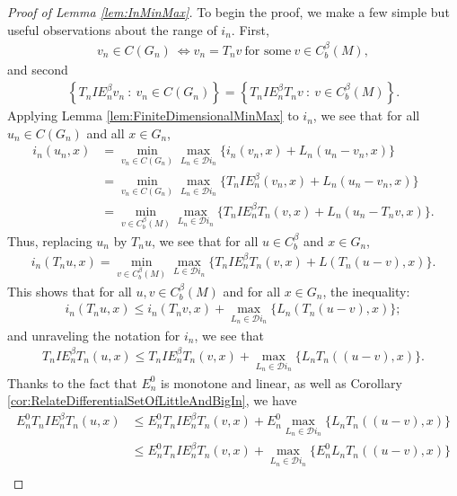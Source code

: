 \documentclass[11pt,reqno]{amsart}
\numberwithin{equation}{section}
\theoremstyle{plain}
\def\D{\mathcal D}
\begin{document}
\begin{proof}[Proof of Lemma \ref{lem:InMinMax}]
	To begin the proof, we make a few simple but useful observations about the range of $i_n$.  First,
	\begin{align*}
		v_n\in C(G_n)\ \iff v_n=T_n v\ \text{for some}\ v\in C^{\beta}_b(M),
	\end{align*}
	and second
	\begin{align*}
		\left\{ T_nIE_n^\beta v_n\ :\ v_n\in C(G_n)    \right\}
		 = \left\{ T_nIE_n^\beta T_nv\ :\ v\in C^{\beta}_b(M)  \right\}.
	\end{align*}
	Applying Lemma \ref{lem:FiniteDimensionalMinMax} to $i_n$, we see that for all $u_n\in C(G_n)$ and all $x\in G_n$,
    \begin{align*}
      i_n(u_n,x) &= \min\limits_{v_n \in C(G_n)}\max\limits_{L_n \in \mathcal{D}i_n} \{ i_n(v_n,x) + L_n(u_n-v_n,x) \}\\
	  &= \min\limits_{v_n \in C(G_n)}\max\limits_{L_n \in \mathcal{D}i_n} \{ T_nIE_n^\beta(v_n,x) + L_n(u_n-v_n,x) \}\\
	  &= \min\limits_{v \in C^\beta_b(M)}\max\limits_{L_n \in \mathcal{D}i_n} \{ T_nIE_n^\beta T_n(v,x) + L_n(u_n-T_n v,x) \}.
    \end{align*}
	Thus, replacing $u_n$ by $T_n u$, we see that for all $u\in C^\beta_b$ and $x\in G_n$,
	\begin{align*}
		i_n(T_n u,x) = \min\limits_{v \in C^\beta_b(M)}\max\limits_{L \in \mathcal{D}i_n} \{ T_nIE_n^\beta T_n(v,x) + L(T_n(u-v),x) \}.
	\end{align*}
	This shows that for all $u,v\in C^\beta_b(M)$ and for all $x\in G_n$, the inequality:
	\begin{align*}
		i_n(T_nu,x)\leq i_n(T_nv,x) + \max_{L_n\in \D i_n}\{ L_n(T_n(u-v),x) \};
	\end{align*}
	and unraveling the notation for $i_n$, we see that
	\begin{align*}
		T_nIE_n^\beta T_n(u,x)\leq T_nIE_n^\beta T_n(v,x) + \max_{ L_n\in \D i_n}\{ L_nT_n((u-v),x) \}.
	\end{align*}
	Thanks to the fact that $E_n^0$ is monotone and linear, as well as Corollary \ref{cor:RelateDifferentialSetOfLittleAndBigIn}, we have
	\begin{align*}
		E_n^0T_nIE_n^\beta T_n(u,x)&\leq E_n^0T_nIE_n^\beta T_n(v,x) + E_n^0\max_{ L_n\in \D i_n}\{ L_nT_n((u-v),x) \}\\
		&\leq E_n^0T_nIE_n^\beta T_n(v,x) + \max_{ L_n\in \D i_n}\{ E_n^0L_nT_n((u-v),x) \}\\

\end{align*}
\end{proof}
\end{document}
